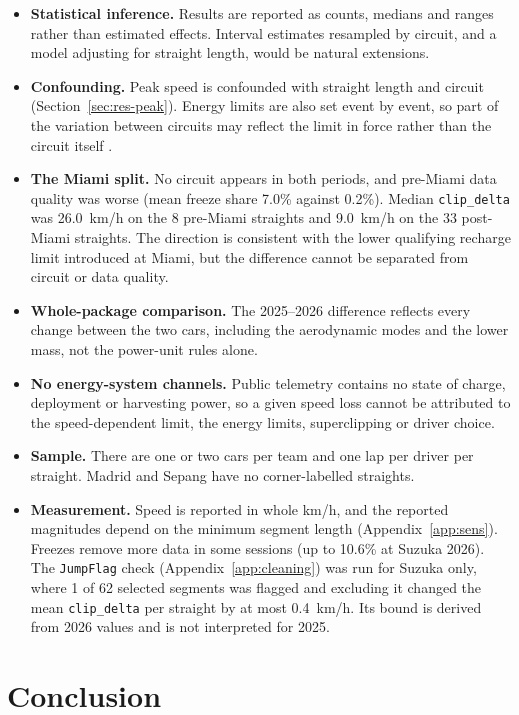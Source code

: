 \documentclass[11pt,a4paper]{article}
\newcommand{\var}[1]{\texttt{#1}}
\begin{document}
\begin{itemize}
  \item \textbf{Statistical inference.} Results are reported as counts, medians and ranges rather than estimated effects. Interval estimates resampled by circuit, and a model adjusting for straight length, would be natural extensions.
  \item \textbf{Confounding.} Peak speed is confounded with straight length and circuit (Section~\ref{sec:res-peak}). Energy limits are also set event by event, so part of the variation between circuits may reflect the limit in force rather than the circuit itself \citep{fia2026refinements}.
  \item \textbf{The Miami split.} No circuit appears in both periods, and pre-Miami data quality was worse (mean freeze share 7.0\% against 0.2\%). Median \var{clip\_delta} was 26.0~km/h on the 8 pre-Miami straights and 9.0~km/h on the 33 post-Miami straights. The direction is consistent with the lower qualifying recharge limit introduced at Miami, but the difference cannot be separated from circuit or data quality.
  \item \textbf{Whole-package comparison.} The 2025--2026 difference reflects every change between the two cars, including the aerodynamic modes and the lower mass, not the power-unit rules alone.
  \item \textbf{No energy-system channels.} Public telemetry contains no state of charge, deployment or harvesting power, so a given speed loss cannot be attributed to the speed-dependent limit, the energy limits, superclipping or driver choice.
  \item \textbf{Sample.} There are one or two cars per team and one lap per driver per straight. Madrid and Sepang have no corner-labelled straights.
  \item \textbf{Measurement.} Speed is reported in whole km/h, and the reported magnitudes depend on the minimum segment length (Appendix~\ref{app:sens}). Freezes remove more data in some sessions (up to 10.6\% at Suzuka 2026). The \var{JumpFlag} check (Appendix~\ref{app:cleaning}) was run for Suzuka only, where 1 of 62 selected segments was flagged and excluding it changed the mean \var{clip\_delta} per straight by at most 0.4~km/h. Its bound is derived from 2026 values and is not interpreted for 2025.
\end{itemize}

\section{Conclusion}
\end{document}
